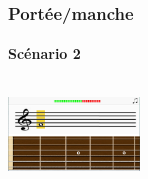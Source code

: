 \documentclass{beamer}
\begin{document}
	\begin{frame}

   		\frametitle{Portée/manche}

       		\framesubtitle{Scénario 2}

		\begin{columns}

			 \begin{column}{0.33\textwidth}

				\includegraphics[width=3.5cm]{images/portee_question.png}

			\end{column}

			 \begin{column}{0.33\textwidth}

				
			\end{column}

			 \begin{column}{0.33\textwidth}

				
			\end{column}

		\end{columns} 

	\end{frame}
\end{document}

